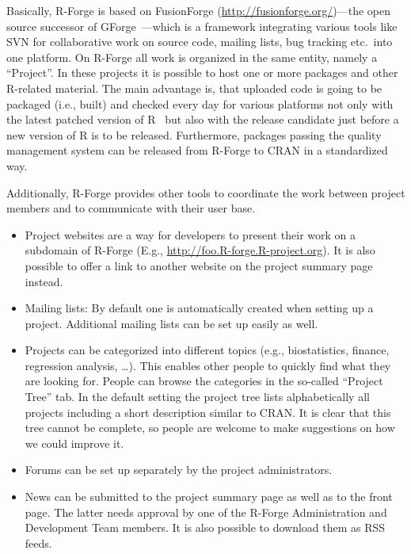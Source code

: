 \documentclass[a4paper]{article}
\newcommand{\RFORGE}{\proglang{R}-Forge Administration and Development Team}
\newcommand{\proglang}[1]{\textsf{#1}}
\begin{document}
Basically, \proglang{R}-Forge is based on FusionForge
(\url{http://fusionforge.org/})---the open source successor of
GForge~\citep{forge:copeland_et_al:2006}---which is a framework
integrating various tools like SVN for collaborative work on source
code, mailing lists, bug tracking etc.\ into one platform. On
\proglang{R}-Forge all work is organized in the same entity, namely a
``Project''. In these projects it is possible to host one or more
packages and other \proglang{R}-related material. The main advantage
is, that uploaded code is going to be packaged (i.e., built) and
checked every day for various platforms not only with the latest
patched version of \proglang{R}~\citep[see \textit{What is the current
  version of \proglang{R}?} in][]{forge:hornik:2010} but also with the
release candidate just before a new version of \proglang{R} is to be
released. Furthermore, packages passing the quality management system
can be released from \proglang{R}-Forge to CRAN in a standardized way.

Additionally, \proglang{R}-Forge provides other tools to coordinate
the work between project members and to communicate with their user
base.

\begin{itemize}
\item Project websites are a way for developers to present their work
  on a subdomain of \proglang{R}-Forge (E.g.,
  \url{http://foo.R-forge.R-project.org}). It is also possible to
  offer a link to another website on the project summary page instead. 
\item Mailing lists: By default one is automatically created when setting up a
  project. Additional mailing lists can be set up easily as well. 
\item Projects can be categorized into different
  topics (e.g., biostatistics, finance, regression analysis,
  \ldots). This enables other people to quickly find what they are
  looking for. People can browse the categories in the so-called
  ``Project Tree'' tab. In the default setting the project tree lists
  alphabetically all projects including a short description similar to
  CRAN. It is clear that this tree cannot be complete, so people are
  welcome to make suggestions on how we could improve it. 
\item Forums can be set up separately by the project
  administrators.%
\item News can be submitted to the project summary page as well as to the
  front page. The latter needs approval by one of the \RFORGE{}
  members. It is also possible to download them as RSS feeds.
\end{itemize} 
\end{document}
